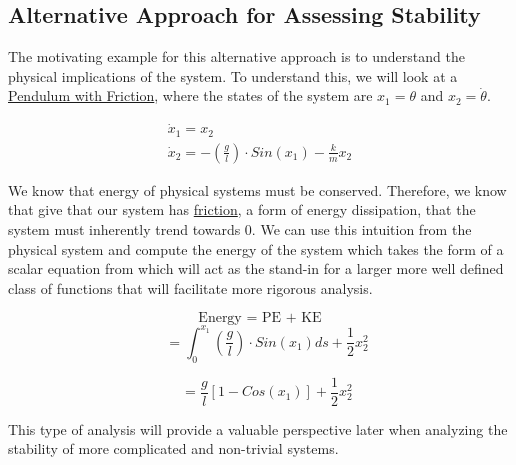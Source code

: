 \subsection*{Alternative Approach for Assessing Stability}

The motivating example for this alternative approach is to understand the physical implications of the system. To understand this, we will look at a \underline{Pendulum with Friction}, where the states of the system are $x_1 = \theta $ and $x_2 = \dot{\theta}$.

$$
\begin{array}{l}
\dot{x}_{1}=x_{2} \\
\dot{x}_{2}= -\left( \frac{g}{l} \right) \cdot Sin(x_1) - \frac{k}{m}x_2
\end{array}
$$

\noindent We know that energy of physical systems must be conserved. Therefore, we know that give that our system has \underline{friction}, a form of energy dissipation, that the system must inherently trend towards $0$. We can use this intuition from the physical system and compute the energy of the system which takes the form of a scalar equation from which will act as the stand-in for a larger more well defined class of functions that will facilitate more rigorous analysis.

$$\text{Energy = PE + KE}$$
$$
\quad = \int_{0}^{x_1} \left( \frac{g}{l} \right) \cdot Sin(x_1) ds + \frac{1}{2} x_2^2
$$

$$
\quad = \frac{g}{l} \left[ 1 - Cos(x_1) \right] + \frac{1}{2} x_2^2
$$


\noindent This type of analysis will provide a valuable perspective later when analyzing the stability of more complicated and non-trivial systems.
